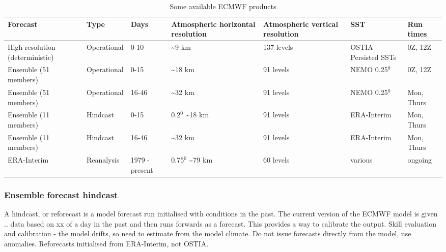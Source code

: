 \begin{landscape}
	
	
	\begin{table}%
		\caption{Some available ECMWF products}\label{t_ecmwf}
		\begin{tabular}{ | p{3.5cm} | p{2.5cm}|  p{1.5cm} | p{2.5cm}|  p{2.5cm} |  p{2.5cm}| p{2.5cm} | }
			\hline\hline
			Forecast & Type & Days & Atmospheric horizontal resolution & Atmospheric vertical resolution & SST & Run times \\
			\hline\hline
			High resolution (deterministic) & Operational & 0-10 & \textasciitilde{9} km & 137 levels & OSTIA Persisted SSTs & 0Z, 12Z \\ %
			\hline
			
			Ensemble         (51 members) & Operational  & 0-15 & \textasciitilde{18} km &  91 levels & NEMO 0.25$^0$  & 0Z, 12Z \\
			Ensemble         (51 members) & Operational & 16-46 & \textasciitilde{32} km &  91 levels & NEMO 0.25$^0$  & Mon, Thurs \\
			
			\hline
			Ensemble         (11 members) & Hindcast & 0-15 & 0.2$^0$ \textasciitilde{18} km &  91 levels & ERA-Interim & Mon, Thurs  \\
			Ensemble         (11 members) & Hindcast & 16-46 & \textasciitilde{32} km &  91 levels & ERA-Interim & Mon, Thurs  
			\\			
			\hline\hline
			ERA-Interim & Reanalysis & 1979 - present & 0.75$^0$ \textasciitilde{79} km & 60 levels & various & ongoing \\
			
			\hline
		\end{tabular}
	\end{table}
\end{landscape}


\subsubsection {Ensemble forecast hindcast}  \label{ECMWF_hindcast}
A hindcast, or reforecast is a model forecast run initialised with conditions in the past. The current version of the ECMWF model is given .. data based on xx of a day in the past and then runs forwards as a forecast. This provides a way to calibrate the output.
Skill evaluation and calibration - the model drifts, so need to estimate from the model climate. Do not issue forecasts directly from the model, use anomalies.
Reforecasts initialised from ERA-Interim, not OSTIA.

